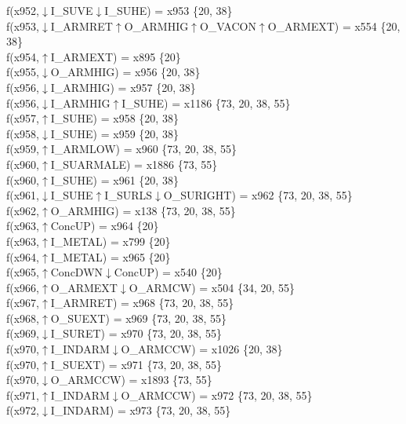 f(x952,$\downarrow$I\_SUVE$\downarrow$I\_SUHE) = x953 \{20, 38\} \\  
f(x953,$\downarrow$I\_ARMRET$\uparrow$O\_ARMHIG$\uparrow$O\_VACON$\uparrow$O\_ARMEXT) = x554 \{20, 38\} \\  
f(x954,$\uparrow$I\_ARMEXT) = x895 \{20\} \\  
f(x955,$\downarrow$O\_ARMHIG) = x956 \{20, 38\} \\  
f(x956,$\downarrow$I\_ARMHIG) = x957 \{20, 38\} \\  
f(x956,$\downarrow$I\_ARMHIG$\uparrow$I\_SUHE) = x1186 \{73, 20, 38, 55\} \\  
f(x957,$\uparrow$I\_SUHE) = x958 \{20, 38\} \\  
f(x958,$\downarrow$I\_SUHE) = x959 \{20, 38\} \\  
f(x959,$\uparrow$I\_ARMLOW) = x960 \{73, 20, 38, 55\} \\  
f(x960,$\uparrow$I\_SUARMALE) = x1886 \{73, 55\} \\  
f(x960,$\uparrow$I\_SUHE) = x961 \{20, 38\} \\  
f(x961,$\downarrow$I\_SUHE$\uparrow$I\_SURLS$\downarrow$O\_SURIGHT) = x962 \{73, 20, 38, 55\} \\  
f(x962,$\uparrow$O\_ARMHIG) = x138 \{73, 20, 38, 55\} \\  
f(x963,$\uparrow$ConcUP) = x964 \{20\} \\  
f(x963,$\uparrow$I\_METAL) = x799 \{20\} \\  
f(x964,$\uparrow$I\_METAL) = x965 \{20\} \\  
f(x965,$\uparrow$ConcDWN$\downarrow$ConcUP) = x540 \{20\} \\  
f(x966,$\uparrow$O\_ARMEXT$\downarrow$O\_ARMCW) = x504 \{34, 20, 55\} \\  
f(x967,$\uparrow$I\_ARMRET) = x968 \{73, 20, 38, 55\} \\  
f(x968,$\uparrow$O\_SUEXT) = x969 \{73, 20, 38, 55\} \\  
f(x969,$\downarrow$I\_SURET) = x970 \{73, 20, 38, 55\} \\  
f(x970,$\uparrow$I\_INDARM$\downarrow$O\_ARMCCW) = x1026 \{20, 38\} \\  
f(x970,$\uparrow$I\_SUEXT) = x971 \{73, 20, 38, 55\} \\  
f(x970,$\downarrow$O\_ARMCCW) = x1893 \{73, 55\} \\  
f(x971,$\uparrow$I\_INDARM$\downarrow$O\_ARMCCW) = x972 \{73, 20, 38, 55\} \\  
f(x972,$\downarrow$I\_INDARM) = x973 \{73, 20, 38, 55\} \\  
